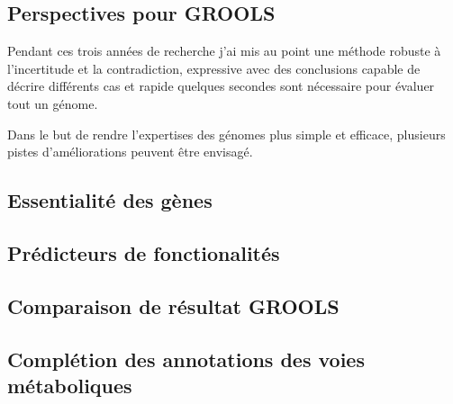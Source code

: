 
\begin{refsegment}
\chapter*{Perspectives pour GROOLS}

Pendant ces trois années de recherche j'ai mis au point une méthode robuste à l'incertitude et la contradiction, expressive avec des conclusions capable de décrire différents cas et rapide quelques secondes sont nécessaire pour évaluer tout un génome.

Dans le but de rendre l'expertises des génomes plus simple et efficace, plusieurs pistes d'améliorations peuvent être envisagé.

\section{Essentialité des gènes}
\section{Prédicteurs de fonctionalités}
\section{Comparaison de résultat GROOLS}
\section{Complétion des annotations des voies métaboliques}


\subbibliography
\end{refsegment}